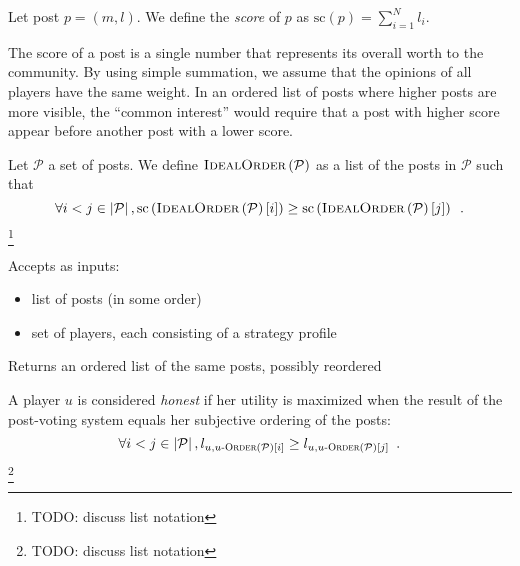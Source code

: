     \begin{definition}
      Let post $p = \left(m, l\right)$. We define the \emph{score} of $p$ as
      $\mathrm{sc}\left(p\right) = \sum\limits_{i = 1}^N l_i$.
    \end{definition}
    The score of a post is a single number that represents its overall worth to
    the community. By using simple summation, we assume that the opinions of all
    players have the same weight. In an ordered list of posts where higher posts
    are more visible, the ``common interest'' would require that a post with
    higher score appear before another post with a lower score.

    \begin{definition}
      Let $\mathcal{P}$ a set of posts. We define
      $\textsc{IdealOrder}\left(\mathcal{P}\right)$ as a list of the posts in
      $\mathcal{P}$ such that
      \begin{equation*}
        \forall i < j \in \left|\mathcal{P}\right|,
        \mathrm{sc}\left(\textsc{IdealOrder}
        \left(\mathcal{P}\right)\left[i\right]\right) \geq
        \mathrm{sc}\left(\textsc{IdealOrder}
        \left(\mathcal{P}\right)\left[j\right]\right) \enspace.
      \end{equation*}\footnote{TODO: discuss list notation}
    \end{definition}

    \begin{definition}
      Accepts as inputs:
      \begin{itemize}
        \item list of posts (in some order)
        \item set of players, each consisting of a strategy profile
      \end{itemize}
      Returns an ordered list of the same posts, possibly reordered
    \end{definition}

    \begin{definition}
      A player $u$ is considered \emph{honest} if her utility is maximized
      when the result of the post-voting system equals her subjective ordering
      of the posts:
      \begin{equation*}
        \forall i < j \in \left|\mathcal{P}\right|, l_{u, u\textsc{-Order}
        \left(\mathcal{P}\right)\left[i\right]} \geq l_{u, u\textsc{-Order}
        \left(\mathcal{P}\right)\left[j\right]}
        \enspace.
      \end{equation*}\footnote{TODO: discuss list notation}
    \end{definition}

